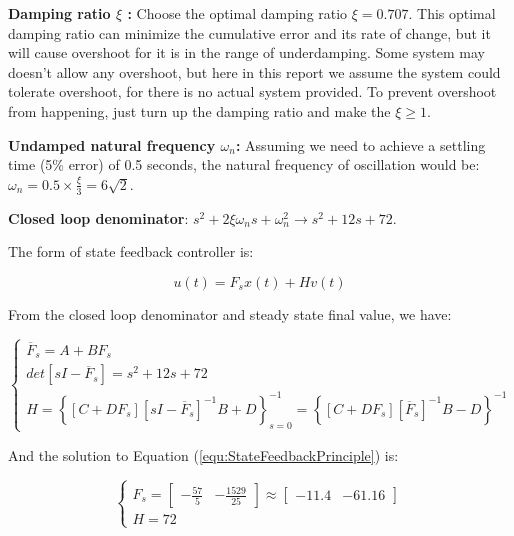 \documentclass[12pt, oneside]{article}
\begin{document}
 \textbf{Damping ratio $\xi$ :} Choose the optimal damping ratio $\xi=0.707$\cite{OptimalDampingRatio}. This optimal damping ratio can minimize the cumulative error and its rate of change, but it will cause overshoot for it is in the range of underdamping. Some system may doesn't allow any overshoot, but here in this report we assume the system could tolerate overshoot, for there is no actual system provided. To prevent overshoot from happening, just turn up the damping ratio and make the $\xi \ge 1$.
 
 \textbf{Undamped natural frequency $\omega_n$:} Assuming we need to achieve a settling time (5\% error) of 0.5 seconds, the natural frequency of oscillation would be: $\omega_n = 0.5\times\frac{\xi}{3}=6\sqrt{2}.$

 \textbf{Closed loop denominator}: $s^2+2\xi\omega_{n}s+\omega_{n}^2 \rightarrow s^2+12s+72$.

The form of state feedback controller is\cite{CourseMaterial}:

\begin{equation}
    u(t) = F_{s}x(t)+Hv(t)
\end{equation}

 From the closed loop denominator and steady state final value, we have:

\begin{equation}
    \begin{cases}
        \overline{F}_s = A+BF_s\\
        det\left[sI-\overline{F}_s\right] = s^2+12s+72\\
        H = \left\{ \left[C+DF_s\right]\left[sI-\overline{F}_s\right]^{-1}B+D \right\}_{s=0}^{-1} = \left\{ \left[C+DF_s\right]\left[\overline{F}_s\right]^{-1}B-D \right\}^{-1}
    \end{cases}
    \label{equ:StateFeedbackPrinciple}
\end{equation}

And the solution to Equation (\ref{equ:StateFeedbackPrinciple}) is:
 
 \begin{equation}
     \begin{cases}
         F_s = \left[\begin{array}{ccc}-\frac{57}{5}&-\frac{1529}{25}\end{array}\right]\approx\left[\begin{array}{ccc}-11.4&-61.16\end{array}\right]\\
         H=72
     \end{cases}
 \end{equation}
\end{document}
